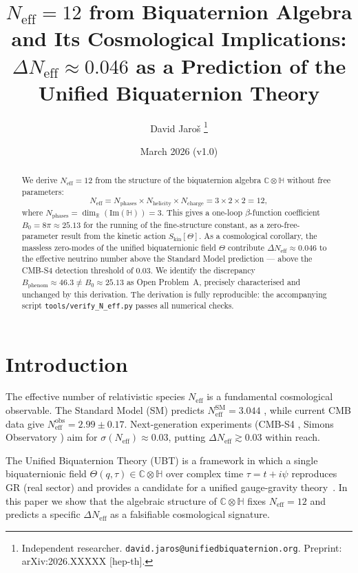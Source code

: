 \documentclass[12pt,a4paper]{article}
\title{%
  $N_{\mathrm{eff}} = 12$ from Biquaternion Algebra and Its
  Cosmological Implications:\\
  $\Delta N_{\mathrm{eff}} \approx 0.046$ as a Prediction of the
  Unified Biquaternion Theory%
}
\author{David Jaro\v{s}%
  \thanks{Independent researcher.
          \texttt{david.jaros@unifiedbiquaternion.org}.
          Preprint: arXiv:2026.XXXXX [hep-th].}%
}
\date{March 2026 \quad (v1.0)}
\theoremstyle{definition}
\theoremstyle{remark}
\newcommand{\C}{\mathbb{C}}
\newcommand{\R}{\mathbb{R}}
\renewcommand{\H}{\mathbb{H}}
\newcommand{\im}{\mathrm{Im}}
\begin{document}
\maketitle

\begin{abstract}
We derive $N_{\mathrm{eff}} = 12$ from the structure of the biquaternion
algebra $\C\otimes\H$ without free parameters:
\[
  N_{\mathrm{eff}} = N_{\mathrm{phases}} \times N_{\mathrm{helicity}}
                    \times N_{\mathrm{charge}}
                  = 3 \times 2 \times 2 = 12,
\]
where $N_{\mathrm{phases}} = \dim_{\R}(\im(\H)) = 3$.
This gives a one-loop $\beta$-function coefficient $B_0 = 8\pi \approx 25.13$
for the running of the fine-structure constant, as a zero-free-parameter
result from the kinetic action $S_{\mathrm{kin}}[\Theta]$.
As a cosmological corollary, the massless zero-modes of the unified
biquaternionic field $\Theta$ contribute
$\Delta N_{\mathrm{eff}} \approx 0.046$
to the effective neutrino number above the Standard Model prediction ---
above the CMB-S4 detection threshold of $0.03$.
We identify the discrepancy $B_{\mathrm{phenom}} \approx 46.3 \neq B_0 \approx 25.13$
as Open Problem~A, precisely characterised and unchanged by this derivation.
The derivation is fully reproducible: the accompanying script
\texttt{tools/verify\_N\_eff.py} passes all numerical checks.
\end{abstract}

\tableofcontents

\section{Introduction}
\label{sec:intro}

The effective number of relativistic species $N_{\mathrm{eff}}$ is a
fundamental cosmological observable.  The Standard Model (SM) predicts
$N_{\mathrm{eff}}^{\mathrm{SM}} = 3.044$ \cite{Mangano2006,deSalas2016},
while current CMB data \cite{Planck2018} give
$N_{\mathrm{eff}}^{\mathrm{obs}} = 2.99 \pm 0.17$.
Next-generation experiments (CMB-S4 \cite{CMB-S4}, Simons Observatory
\cite{SimonsObs}) aim for $\sigma(N_{\mathrm{eff}}) \approx 0.03$, putting
$\Delta N_{\mathrm{eff}} \gtrsim 0.03$ within reach.

The Unified Biquaternion Theory (UBT) is a framework in which a single
biquaternionic field $\Theta(q,\tau)\in\C\otimes\H$ over complex time
$\tau = t + i\psi$ reproduces GR (real sector) and provides a candidate
for a unified gauge-gravity theory~\cite{UBT_main}.
In this paper we show that the algebraic structure of $\C\otimes\H$
fixes $N_{\mathrm{eff}} = 12$ and predicts a specific $\Delta N_{\mathrm{eff}}$
as a falsifiable cosmological signature.
\end{document}
